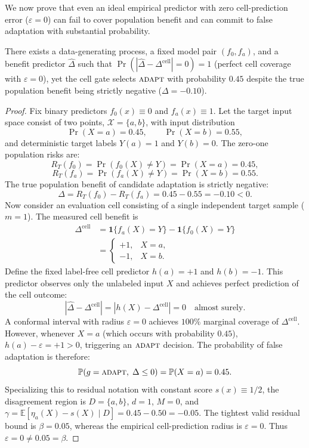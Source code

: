 We now prove that even an ideal empirical predictor with zero cell-prediction error ($\varepsilon = 0$) can
fail to cover population benefit and can commit to false adaptation with substantial probability.

\begin{proposition}\label{prop:cell-fail}
There exists a data-generating process, a fixed model pair $(f_0, f_a)$, and a benefit predictor $\widehat\Delta$
such that $\Pr(|\widehat\Delta - \Delta^{\mathrm{cell}}| = 0) = 1$ (perfect cell coverage with $\varepsilon = 0$),
yet the cell gate selects $\textnormal{\textsc{adapt}}$ with probability $0.45$ despite the true population benefit being strictly
negative ($\Delta = -0.10$).
\end{proposition}

\begin{proof}
Fix binary predictors $f_0(x) \equiv 0$ and $f_a(x) \equiv 1$. Let the target input space consist of two points,
$\mathcal X = \{a, b\}$, with input distribution
\[
 \Pr(X = a) = 0.45, \qquad \Pr(X = b) = 0.55,
\]
and deterministic target labels $Y(a) = 1$ and $Y(b) = 0$.
The zero-one population risks are:
\[
 R_T(f_0) = \Pr(f_0(X) \neq Y) = \Pr(X = a) = 0.45,
\]
\[
 R_T(f_a) = \Pr(f_a(X) \neq Y) = \Pr(X = b) = 0.55.
\]
The true population benefit of candidate adaptation is strictly negative:
\[
 \Delta = R_T(f_0) - R_T(f_a) = 0.45 - 0.55 = -0.10 < 0.
\]
Now consider an evaluation cell consisting of a single independent target sample ($m=1$).
The measured cell benefit is
\begin{align*}
 \Delta^{\mathrm{cell}} &= \mathbf 1\{f_a(X) = Y\} - \mathbf 1\{f_0(X) = Y\} \\
 &=
 \begin{cases}
 +1, & X = a, \\
 -1, & X = b.
 \end{cases}
\end{align*}
Define the fixed label-free cell predictor $h(a) = +1$ and $h(b) = -1$. This predictor observes only the
unlabeled input $X$ and achieves perfect prediction of the cell outcome:
\[
 |\widehat\Delta - \Delta^{\mathrm{cell}}| = |h(X) - \Delta^{\mathrm{cell}}| = 0 \quad \text{almost surely.}
\]
A conformal interval with radius $\varepsilon = 0$ achieves $100\%$ marginal coverage of $\Delta^{\mathrm{cell}}$.
However, whenever $X = a$ (which occurs with probability $0.45$), $h(a) - \varepsilon = +1 > 0$, triggering
an $\textnormal{\textsc{adapt}}$ decision. The probability of false adaptation is therefore:
\[
 \mathbb{P}(g = \textnormal{\textsc{adapt}}, \; \Delta \le 0) = \mathbb{P}(X = a) = 0.45.
\]
Specializing this to residual notation with constant score $s(x) \equiv 1/2$, the disagreement region is $D = \{a, b\}$,
$d = 1$, $M = 0$, and $\gamma = \mathbb E[\eta_a(X) - s(X) \mid D] = 0.45 - 0.50 = -0.05$.
The tightest valid residual bound is $\beta = 0.05$, whereas the empirical cell-prediction radius is $\varepsilon = 0$.
Thus $\varepsilon = 0 \neq 0.05 = \beta$.
\end{proof}


